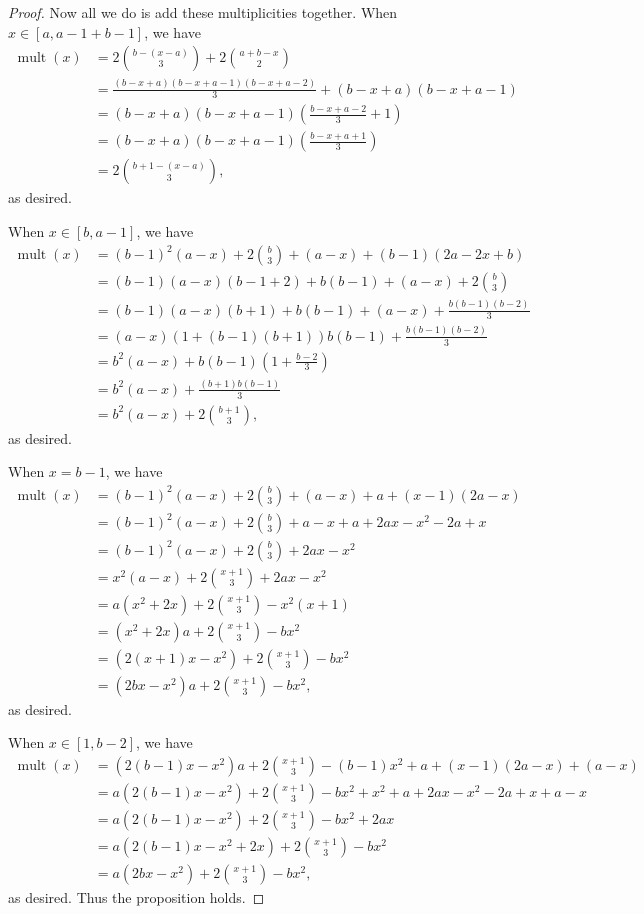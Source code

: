 \documentclass[12]{article}
\DeclareMathOperator{\mult}{mult}
\theoremstyle{definition}
\begin{document}
\begin{proof}
	
	Now all we do is add these multiplicities together.  When $x \in [a,a-1+b-1]$, we have 
	\begin{align*}
		\mult(x) &= 2{b-(x-a) \choose 3} + 2{a+b-x \choose 2}	\\
		&= \frac{(b-x+a)(b-x+a-1)(b-x+a-2)}{3} + (b-x+a)(b-x+a-1)	\\
		&= (b-x+a)(b-x+a-1)(\frac{b-x+a-2}{3} + 1)	\\
		&= (b-x+a)(b-x+a-1)(\frac{b-x+a+1}{3})	\\
		&= 2{b+1-(x-a) \choose 3},
	\end{align*}
	as desired.
	
	When $x \in [b,a-1]$, we have
	\begin{align*}
		\mult(x) &= (b-1)^2(a-x) + 2{b \choose 3} + (a-x) + (b-1)(2a-2x+b)	\\
		&= (b-1)(a-x)(b-1 + 2) + b(b-1) + (a-x) + 2{b \choose 3}	\\
		&= (b-1)(a-x)(b+1) + b(b-1) + (a-x) + \frac{b(b-1)(b-2)}{3}	\\
		&= (a-x)(1+ (b-1)(b+1)) b(b-1) + \frac{b(b-1)(b-2)}{3}	\\
		&= b^2(a-x) + b(b-1)(1 + \frac{b-2}{3})	\\
		&= b^2(a-x) + \frac{(b+1)b(b-1)}{3}	\\
		&= b^2(a-x) + 2{b+1 \choose 3},
	\end{align*}
	as desired.
	
	When $x= b-1$, we have
	\begin{align*}
		\mult(x) &= (b-1)^2(a-x) + 2{b \choose 3} + (a-x) + a+(x-1)(2a-x)	\\
		&=(b-1)^2(a-x) + 2{b \choose 3} + a-x + a + 2ax - x^2 - 2a + x	\\
		&=(b-1)^2(a-x) + 2{b \choose 3} + 2ax - x^2	\\
		&=x^2(a-x) + 2{x+1 \choose 3} + 2ax - x^2	\\
		&= a(x^2+2x) + 2{x+1 \choose 3} - x^2(x+1)	\\
		&= (x^2 + 2x)a + 2{x+1 \choose 3} - bx^2	\\
		&= (2(x+1)x - x^2) + 2{x+1 \choose 3} - bx^2	\\
		&= (2bx-x^2)a+2 {x+1 \choose 3} - bx^2,
	\end{align*}
	as desired.
	
	When $x \in [1,b-2]$, we have
	\begin{align*}
		\mult(x) &= (2(b-1)x-x^2)a + 2{x+1 \choose 3} - (b-1)x^2 + a+(x-1)(2a-x) + (a-x)	\\
		&= a(2(b-1)x-x^2) + 2{x+1 \choose 3} - bx^2 + x^2 + a + 2ax - x^2 - 2a + x + a - x	\\
		&= a(2(b-1)x-x^2) + 2{x+1 \choose 3} -bx^2 + 2ax	\\
		&= a(2(b-1)x-x^2 + 2x) + 2{x+1 \choose 3} - bx^2	\\
		&= a(2bx - x^2) + 2{x+1 \choose 3} - bx^2,
	\end{align*}
	as desired.  Thus the proposition holds. \qedhere
	\end{proof}
\end{document}
